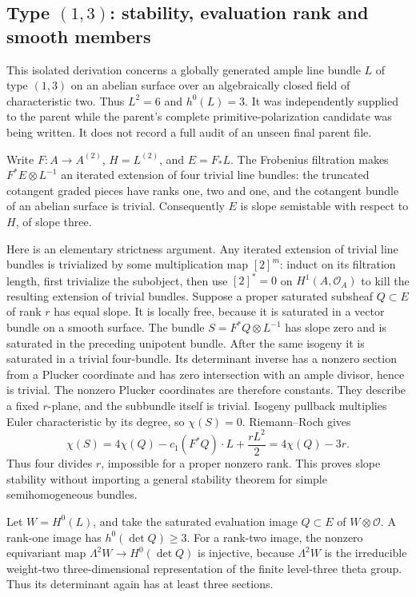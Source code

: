 \subsection*{Type \((1,3)\): stability, evaluation rank and smooth members}

This isolated derivation concerns a globally generated ample line bundle
\(L\) of type \((1,3)\) on an abelian surface over an algebraically
closed field of characteristic two. Thus \(L^2=6\) and \(h^0(L)=3\).
It was independently supplied to the parent while the parent's complete
primitive-polarization candidate was being written. It does not record a
full audit of an unseen final parent file.

Write \(F:A\to A^{(2)}\), \(H=L^{(2)}\), and \(E=F_*L\).
The Frobenius filtration makes
\(F^*E\otimes L^{-1}\) an iterated extension of four trivial
line bundles: the truncated cotangent graded pieces have ranks one,
two and one, and the cotangent bundle of an abelian surface is trivial.
Consequently \(E\) is slope semistable with respect to \(H\),
of slope three.

Here is an elementary strictness argument. Any iterated extension of
trivial line bundles is trivialized by some multiplication map
\([2]^m\): induct on its filtration length, first trivialize the
subobject, then use \([2]^*=0\) on \(H^1(A,\mathcal O_A)\) to kill
the resulting extension of trivial bundles. Suppose a proper saturated
subsheaf \(Q\subset E\) of rank \(r\) has equal slope. It is
locally free, because it is saturated in a vector bundle on a smooth
surface. The bundle \(S=F^*Q\otimes L^{-1}\) has slope zero and is
saturated in the preceding unipotent bundle. After the same isogeny it
is saturated in a trivial four-bundle. Its determinant inverse has a
nonzero section from a Plucker coordinate and has zero intersection
with an ample divisor, hence is trivial. The nonzero Plucker coordinates
are therefore constants. They describe a fixed \(r\)-plane, and the
subbundle itself is trivial. Isogeny pullback multiplies Euler
characteristic by its degree, so \(\chi(S)=0\). Riemann--Roch gives
\[
 \chi(S)=4\chi(Q)-c_1(F^*Q)\cdot L+\frac{rL^2}{2}
        =4\chi(Q)-3r.
\]
Thus four divides \(r\), impossible for a proper nonzero rank.
This proves slope stability without importing a general stability
theorem for simple semihomogeneous bundles.

Let \(W=H^0(L)\), and take the saturated evaluation image
\(Q\subset E\) of \(W\otimes\mathcal O\). A rank-one image has
\(h^0(\det Q)\ge3\). For a rank-two image, the nonzero equivariant
map \(\Lambda^2W\to H^0(\det Q)\) is injective, because
\(\Lambda^2W\) is the irreducible weight-two three-dimensional
representation of the finite level-three theta group. Thus its
determinant again has at least three sections.

